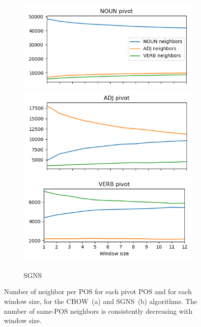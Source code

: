 \documentclass[11pt,a4paper]{article}
\begin{document}
\begin{figure}[t]
\begin{subfigure}[b]{\columnwidth}
        \includegraphics[width=\columnwidth]{figs/NOUN_nn_100_fasttext_enwiki-20170501-clean_skipgram-300d-min500_pos.png}
        \includegraphics[width=\columnwidth]{figs/ADJ_nn_100_fasttext_enwiki-20170501-clean_skipgram-300d-min500_pos.png}
        \includegraphics[width=\columnwidth]{figs/VERB_nn_100_fasttext_enwiki-20170501-clean_skipgram-300d-min500_pos.png}
        \caption{SGNS}
        \end{subfigure}
        \caption{Number of neighbor per POS for each pivot POS and for each window size,
        for the CBOW~(a) and SGNS~(b) algorithms.
        The number of same-POS neighbors is consistently decreasing with window size.
        \label{fig:nn_pos_hist}}
    \end{figure}
    
\end{document}

